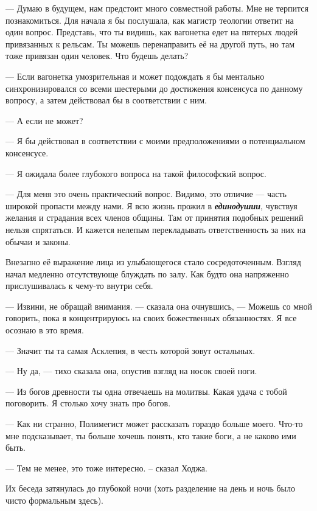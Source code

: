 \documentclass[12pt,a4paper]{article}
\newcommand{\tr}[1]{\textcolor{red}{#1}}
\newcommand{\todo}[1]{\marginpar{\scriptsize \tr{#1}}}
\begin{document}
--- Думаю в будущем, нам предстоит много совместной работы. Мне не терпится познакомиться. Для начала я бы послушала, как магистр теологии ответит на один вопрос. \todo{фентезийная, но узнаваемая версия дилеммы вагонетки} Представь, что ты видишь, как вагонетка едет на пятерых людей привязанных к рельсам. Ты можешь перенаправить её на другой путь, но там тоже привязан один человек. Что будешь делать?

--- Если вагонетка умозрительная и может подождать я бы ментально синхронизировался со всеми шестерыми до достижения консенсуса по данному вопросу, а затем действовал бы в соответствии с ним.

--- А если не может?

--- Я бы действовал в соответствии с моими предположениями о потенциальном консенсусе.


--- Я ожидала более глубокого вопроса на такой философский вопрос.

--- Для меня это очень практический вопрос. Видимо, это отличие --- часть широкой пропасти между нами. Я всю жизнь прожил в \textbf{\textit{единодушии}}, чувствуя желания и страдания всех членов общины. Там от принятия подобных решений нельзя спрятаться. И кажется нелепым перекладывать ответственность за них на обычаи и законы.

Внезапно её выражение лица из улыбающегося стало сосредоточенным. Взгляд начал медленно отсутствующе блуждать по залу. Как будто она напряженно прислушивалась к чему-то внутри себя.

--- Извини, не обращай внимания. --- сказала она очнувшись, --- Можешь со мной говорить, пока я концентрируюсь на своих божественных обязанностях. Я все осознаю в это время.

--- Значит ты та самая Асклепия, в честь которой зовут остальных.

--- Ну да, --- тихо сказала она, опустив взгляд на носок своей ноги.

--- Из богов древности ты одна отвечаешь на молитвы. Какая удача с тобой поговорить. Я столько хочу знать про богов.

--- Как ни странно, Полимегист может рассказать гораздо больше моего. Что-то мне подсказывает, ты больше хочешь понять, кто такие боги, а не каково ими быть.

--- Тем не менее, это тоже интересно. -- сказал Ходжа.

Их беседа затянулась до глубокой ночи (хоть разделение на день и ночь было чисто формальным здесь).
\end{document}
